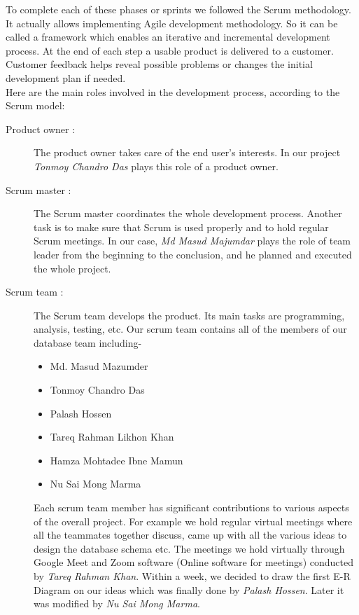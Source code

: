 To complete each of these phases or sprints we followed the Scrum methodology. It actually allows implementing Agile development methodology. So it can be called a framework which enables an iterative and incremental development process. At the end of each step a usable product is delivered to a customer. Customer feedback helps reveal possible problems or changes the initial development plan if needed.\\
Here are the main roles involved in the development process, according to the Scrum model:
\begin{description}
\item[Product owner :] The product owner takes care of the end user’s interests. In our project \textit{Tonmoy Chandro Das} plays this role of a product owner. 

\item[Scrum master :] The Scrum master coordinates the whole development process. Another task is to make sure that Scrum is used properly and to hold regular Scrum meetings. In our case, \textit{Md Masud Majumdar} plays the role of team leader from the beginning to the conclusion, and he planned and executed the whole project.

\item[Scrum team :] The Scrum team develops the product. Its main tasks are programming, analysis, testing, etc. Our scrum team contains all of the members of our database team including-
\begin{itemize}
\item Md. Masud Mazumder
\item Tonmoy Chandro Das
\item Palash Hossen
\item Tareq Rahman Likhon Khan
\item Hamza Mohtadee Ibne Mamun
\item Nu Sai Mong Marma
\end{itemize}

Each scrum team member has significant contributions to various aspects of the overall project. For example we hold regular virtual meetings where all the teammates together discuss, came up with all the various ideas to design the database schema etc. The meetings we hold virtually through Google Meet and Zoom software (Online software for meetings) conducted by \textit{Tareq Rahman Khan}. Within a week, we decided to draw the first E-R Diagram on our ideas which was finally done by \textit{Palash Hossen}. Later it was modified by \textit{Nu Sai Mong Marma}.\\


\end{description}
